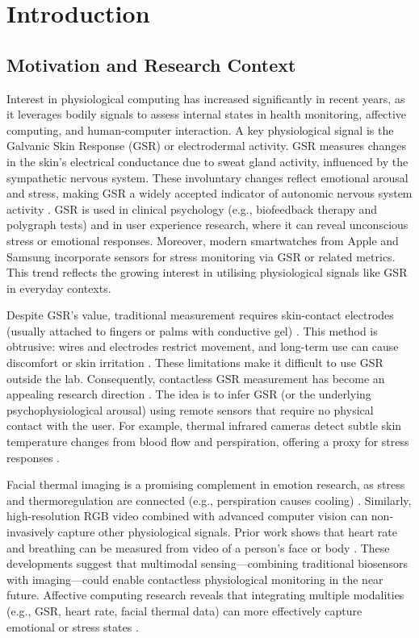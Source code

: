 \chapter{Introduction}


\section{Motivation and Research Context}
Interest in physiological computing has increased significantly in recent years, as it leverages bodily signals to assess internal states in health monitoring, affective computing, and human-computer interaction. A key physiological signal is the Galvanic Skin Response (GSR) or electrodermal activity. GSR measures changes in the skin's electrical conductance due to sweat gland activity, influenced by the sympathetic nervous system. These involuntary changes reflect emotional arousal and stress, making GSR a widely accepted indicator of autonomic nervous system activity \cite{ref1}. GSR is used in clinical psychology (e.g., biofeedback therapy and polygraph tests) and in user experience research, where it can reveal unconscious stress or emotional responses. Moreover, modern smartwatches from Apple and Samsung incorporate sensors for stress monitoring via GSR or related metrics. This trend reflects the growing interest in utilising physiological signals like GSR in everyday contexts.

Despite GSR's value, traditional measurement requires skin-contact electrodes (usually attached to fingers or palms with conductive gel) \cite{ref3}. This method is obtrusive: wires and electrodes restrict movement, and long-term use can cause discomfort or skin irritation \cite{ref3}. These limitations make it difficult to use GSR outside the lab. Consequently, contactless GSR measurement has become an appealing research direction \cite{ref4}. The idea is to infer GSR (or the underlying psychophysiological arousal) using remote sensors that require no physical contact with the user. For example, thermal infrared cameras detect subtle skin temperature changes from blood flow and perspiration, offering a proxy for stress responses \cite{ref5}.

Facial thermal imaging is a promising complement in emotion research, as stress and thermoregulation are connected (e.g., perspiration causes cooling) \cite{ref5}. Similarly, high-resolution RGB video combined with advanced computer vision can non-invasively capture other physiological signals. Prior work shows that heart rate and breathing can be measured from video of a person's face or body \cite{ref6}. These developments suggest that multimodal sensing---combining traditional biosensors with imaging---could enable contactless physiological monitoring in the near future. Affective computing research reveals that integrating multiple modalities (e.g., GSR, heart rate, facial thermal data) can more effectively capture emotional or stress states \cite{ref1}.

